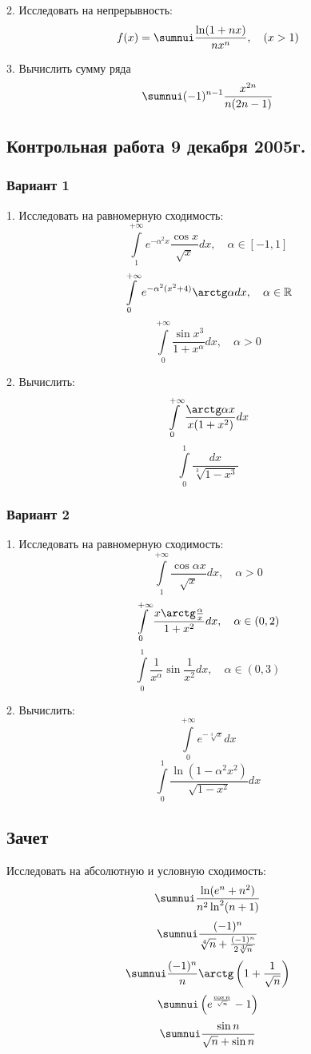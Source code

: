 \documentclass[a4paper]{article}
\newcommand{\No}{\textnumero}
\begin{document}
2. Исследовать на непрерывность:
$$
f(x)=\sumnui \frac{\ln(1+nx)}{nx^n}, \quad (x>1)
$$

3. Вычислить сумму ряда
$$
\sumnui (-1)^{n-1}\frac{x^{2n}}{n(2n-1)}
$$

\subsection{Контрольная работа 9 декабря 2005г.}

\subsubsection{Вариант 1}

1. Исследовать на равномерную сходимость:
$$
\int\limits_1^{+\infty}e^{-\alpha^2x}\frac{\cos x}{\sqrt x}dx,
\quad \alpha\in [-1, 1]
$$
$$
\int\limits_0^{+\infty}e^{-\alpha^2(x^2+4)}\arctg \alpha dx,\quad
\alpha \in \mathbb{R}
$$
$$
\int\limits^{+\infty}_0\frac{\sin x^3}{1+x^\alpha}dx,\quad \alpha
>0
$$

2. Вычислить:
$$
\int\limits_0^{+\infty}\frac{\arctg \alpha x}{x(1+x^2)}dx
$$
$$
\int\limits_0^1\frac{dx}{\sqrt[3]{1-x^3}}
$$

\subsubsection{Вариант 2}

1. Исследовать на равномерную сходимость:
$$
\int\limits_1^{+\infty}\frac{\cos \alpha x}{\sqrt x}dx,\quad
\alpha >0
$$
$$
\int\limits_0^{+\infty}\frac{x\arctg
\frac{\alpha}{x}}{1+x^2}dx,\quad \alpha\in (0, 2)
$$
$$
\int\limits_0^1\frac{1}{x^\alpha}\sin\frac{1}{x^2}dx, \quad
\alpha\in (0, 3)
$$

2. Вычислить:
$$
\int\limits_0^{+\infty}e^{-\sqrt[3]{x}}dx
$$
$$
\int\limits_0^1\frac{\ln(1-\alpha ^2x^2)}{\sqrt{1-x^2}}dx
$$

\subsection{Зачет \No 1}

Исследовать на абсолютную и условную сходимость:
$$
\sumnui \frac{\ln (e^n+n^2)}{n^2\ln^2(n+1)}
$$
$$
\sumnui \frac{(-1)^n}{\sqrt[4]{n}+\frac{(-1)^n}{2\sqrt[4]{n}}}
$$
$$
\sumnui \frac{(-1)^n}{n}\arctg \left(1+\frac{1}{\sqrt{n}}\right)
$$
$$
\sumnui \left( e^\frac{\cos n}{\sqrt n}-1\right)
$$
$$
\sumnui \frac{\sin n}{\sqrt n +\sin n}
$$
\end{document}
